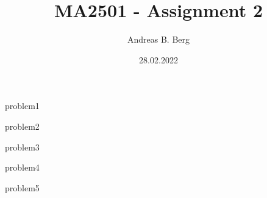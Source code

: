\documentclass{article}
\begin{document}
\mainmatter

\title{MA2501 - Assignment 2}
\author{Andreas B. Berg}
\date{28.02.2022}
\maketitle
\thispagestyle{fancy}

{problem1}

\pagebreak
{problem2}

\pagebreak
{problem3}

\pagebreak
{problem4}

\pagebreak
{problem5}


\end{document}
